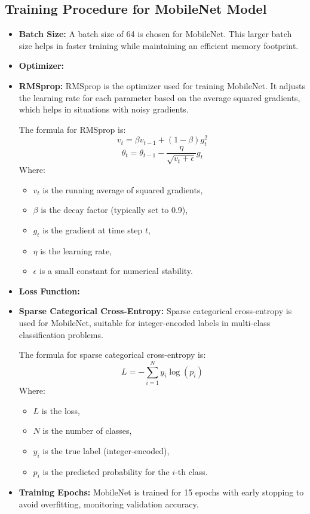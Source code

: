 \documentclass{article}
\begin{document}
\subsection{Training Procedure for MobileNet Model}

\begin{itemize}
    \item \textbf{Batch Size:} A batch size of 64 is chosen for MobileNet. This larger batch size helps in faster training while maintaining an efficient memory footprint.
    \item \textbf{Optimizer:} \item \textbf{RMSprop:} RMSprop is the optimizer used for training MobileNet. It adjusts the learning rate for each parameter based on the average squared gradients, which helps in situations with noisy gradients.

    The formula for RMSprop is:
    \[
    v_t = \beta v_{t-1} + (1 - \beta) g_t^2
    \]
    \[
    \theta_t = \theta_{t-1} - \frac{\eta}{\sqrt{v_t + \epsilon}} g_t
    \]
    Where:
    \begin{itemize}
        \item \( v_t \) is the running average of squared gradients,
        \item \( \beta \) is the decay factor (typically set to 0.9),
        \item \( g_t \) is the gradient at time step \( t \),
        \item \( \eta \) is the learning rate,
        \item \( \epsilon \) is a small constant for numerical stability.
    \end{itemize}
    \item \textbf{Loss Function:} \item \textbf{Sparse Categorical Cross-Entropy:} Sparse categorical cross-entropy is used for MobileNet, suitable for integer-encoded labels in multi-class classification problems.

    The formula for sparse categorical cross-entropy is:
    \[
    L = - \sum_{i=1}^{N} y_i \log(p_i)
    \]
    Where:
    \begin{itemize}
        \item \( L \) is the loss,
        \item \( N \) is the number of classes,
        \item \( y_i \) is the true label (integer-encoded),
        \item \( p_i \) is the predicted probability for the \( i \)-th class.
    \end{itemize}
    \item \textbf{Training Epochs:} MobileNet is trained for 15 epochs with early stopping to avoid overfitting, monitoring validation accuracy.
\end{itemize}
\end{document}
